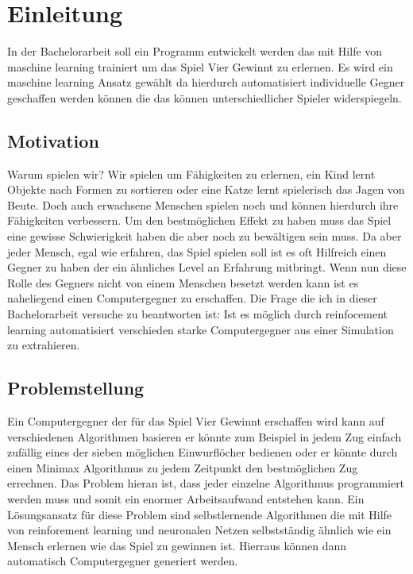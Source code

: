 \chapter{Einleitung}
\label{cha:Einleitung}

In der Bachelorarbeit soll ein Programm entwickelt werden das mit Hilfe von maschine learning trainiert um das Spiel Vier Gewinnt zu erlernen. 
Es wird ein maschine learning Ansatz gewählt da hierdurch automatisiert individuelle Gegner geschaffen werden können die das können unterschiedlicher Spieler widerspiegeln.%


\section{Motivation}
Warum spielen wir? Wir spielen um Fähigkeiten zu erlernen, ein Kind lernt Objekte nach Formen zu sortieren oder eine Katze lernt spielerisch das Jagen von Beute. Doch auch erwachsene Menschen spielen noch und können hierdurch ihre Fähigkeiten verbessern.  Um den bestmöglichen Effekt zu haben muss das Spiel eine gewisse Schwierigkeit haben die aber noch zu bewältigen sein muss. Da aber jeder Mensch, egal wie erfahren, das Spiel spielen soll ist es oft Hilfreich einen Gegner zu haben der ein ähnliches Level an Erfahrung mitbringt. Wenn nun diese Rolle des Gegners nicht von einem Menschen besetzt werden kann ist es naheliegend einen Computergegner zu erschaffen. Die Frage die ich in dieser Bachelorarbeit versuche zu beantworten ist: Ist es möglich durch reinfocement learning automatisiert verschieden starke Computergegner aus einer Simulation zu extrahieren.


\section{Problemstellung}
Ein Computergegner der für das Spiel Vier Gewinnt erschaffen wird kann auf verschiedenen Algorithmen basieren er könnte zum Beispiel in jedem Zug einfach zufällig eines der sieben möglichen Einwurflöcher bedienen oder er könnte durch einen Minimax Algorithmus zu jedem Zeitpunkt den bestmöglichen Zug errechnen. 
Das Problem hieran ist, dass jeder einzelne Algorithmus programmiert werden muss und somit ein enormer Arbeitsaufwand entstehen kann.
Ein Lösungsansatz für diese Problem sind selbstlernende Algorithmen die mit Hilfe von reinforement learning und neuronalen Netzen selbstständig ähnlich wie ein Mensch erlernen wie das Spiel zu gewinnen ist.
Hierraus können dann automatisch Computergegner generiert werden.

